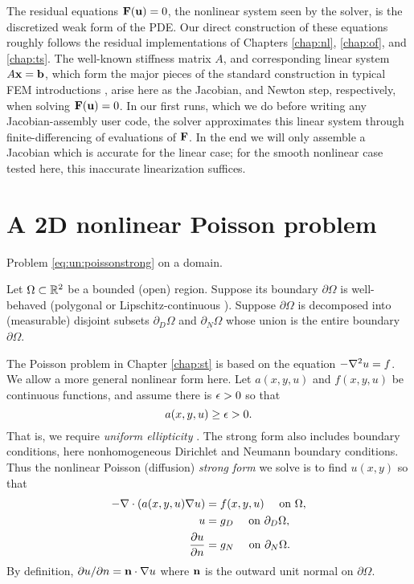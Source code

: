 The residual equations $\mathbf{F}(\mathbf{u})=0$, the nonlinear system seen by the \pSNES solver, is the discretized weak form of the PDE.  Our direct construction of these equations roughly follows the residual implementations of Chapters \ref{chap:nl}, \ref{chap:of}, and \ref{chap:ts}.  The well-known stiffness matrix $A$, and corresponding linear system $A\mathbf{x} = \mathbf{b}$, which form the major pieces of the standard construction in typical FEM introductions \citep{Braess2007,Elmanetal2005}, arise here as the Jacobian, and Newton step, respectively, when solving $\mathbf{F}(\mathbf{u})=0$.  In our first runs, which we do before writing any Jacobian-assembly user code, the \pSNES solver approximates this linear system through finite-differencing of evaluations of $\mathbf{F}$.  In the end we will only assemble a Jacobian which is accurate for the linear case; for the smooth nonlinear case tested here, this inaccurate linearization suffices.

\section{A 2D nonlinear Poisson problem}

\begin{marginfigure}

\caption{Problem \eqref{eq:un:poissonstrong} on a domain.}
\label{fig:un:generalpoissondomain}
\end{marginfigure}

Let $\Omega \subset \mathbb{R}^2$ be a bounded (open) region.  Suppose its boundary $\partial\Omega$ is well-behaved (polygonal or Lipschitz-continuous \citep[section 1.2]{Ciarlet2002}).  Suppose $\partial\Omega$ is decomposed into (measurable) disjoint subsets $\partial_D \Omega$ and $\partial_N \Omega$ whose union is the entire boundary $\partial \Omega$.

The Poisson problem in Chapter \ref{chap:st} is based on the equation $- \nabla^2 u = f$.  We allow a more general nonlinear form here.  Let $a(x,y,u)$ and $f(x,y,u)$ be continuous functions, and assume there is $\epsilon>0$ so that
    $$a(x,y,u) \ge \epsilon > 0.$$
That is, we require \emph{uniform ellipticity} \citep{Evans2010}.  The strong form also includes boundary conditions, here nonhomogeneous Dirichlet and Neumann boundary conditions.  Thus the  nonlinear Poisson (diffusion) \emph{strong form} we solve is to find $u(x,y)$ so that
\begin{align}
- \nabla\cdot \left(a(x,y,u) \nabla u\right) &= f(x,y,u) \quad \text{ on } \Omega, \label{eq:un:poissonstrong} \\
u &= g_D \quad \text{ on } \partial_D \Omega, \notag \\
\frac{\partial u}{\partial n} &= g_N \quad \text{ on } \partial_N \Omega. \notag
\end{align}
By definition, $\partial u/\partial n = \mathbf{n} \cdot \nabla u$ where $\mathbf{n}$ is the outward unit normal on $\partial \Omega$.

